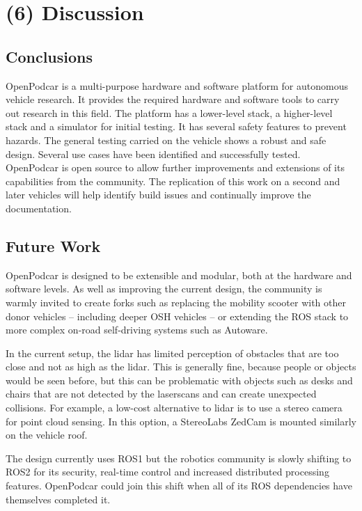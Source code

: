 \documentclass[a4paper]{article}
\begin{document}
	
	\section{(6) Discussion}\label{h.90jl7wm65t65}
	
	\subsection{Conclusions}\label{h.h3fr33ylzsnh}
	
	OpenPodcar is a multi-purpose hardware and software platform for autonomous vehicle research. It provides the required hardware and software tools to carry out research in this field. The platform has a lower-level stack, a higher-level stack and a simulator for initial testing. It has several safety features to prevent hazards. The general testing carried on the vehicle shows a robust and safe design. Several use cases have been identified and successfully tested. OpenPodcar is open source to allow further improvements and extensions of its capabilities from the community. The replication of this work on a second and later vehicles will help identify build issues and continually improve the documentation.
	
	\subsection{Future Work}\label{h.neocsr410zj}
	
	OpenPodcar is designed to be extensible and modular, both at the hardware and software levels.  As well as improving the current design, the community is warmly invited to create forks such as replacing the mobility scooter with other donor vehicles -- including deeper OSH vehicles -- or extending the ROS stack to more complex on-road self-driving systems such as Autoware.
	
	In the current setup, the lidar has limited perception of obstacles that are too close and not as high as the lidar. This is generally fine, because people or objects would be seen before, but this can be problematic with objects such as desks and chairs that are not detected by the laserscans and can create unexpected collisions. For example, a low-cost alternative to lidar is to use a stereo camera for point cloud sensing. In this option, a StereoLabs ZedCam is mounted similarly on the vehicle roof. 
	
	The design currently uses ROS1 but the robotics community is slowly shifting to ROS2 for its security, real-time control and increased distributed processing features.  OpenPodcar could join this shift when all of its ROS dependencies have themselves completed it.
	
\end{document}
